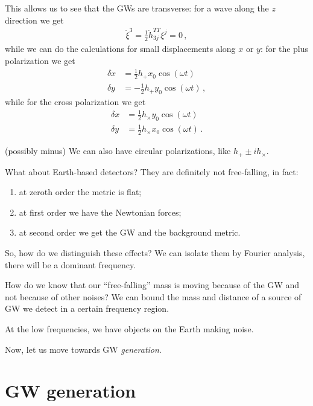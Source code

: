 \documentclass[main.tex]{subfiles}
\begin{document}
This allows us to see that the GWs are transverse: for a wave along the \(z\) direction we get 
%
\begin{align}
\ddot{\xi}^{3} = \frac{1}{2} \ddot{h}_{3j}^{TT} \xi^{j} = 0
\,,
\end{align}
%
while we can do the calculations for small displacements along \(x\) or \(y\): for the plus polarization we get 
%
\begin{subequations}
\begin{align}
  \delta x &= \frac{1}{2} h_{+} x_0 \cos(\omega t)  \\
  \delta y &= - \frac{1}{2} h_{+} y_0 \cos(\omega t)  
\,,
\end{align}
\end{subequations}
%
while for the cross polarization we get 
%
\begin{subequations}
\begin{align}
\delta x &= \frac{1}{2} h_{ \times } y_0 \cos(\omega t)  \\
\delta y &= \frac{1}{2} h_{ \times } x_0 \cos(\omega t)  
\,.
\end{align}
\end{subequations}

(possibly minus)
We can also have circular polarizations, like \(h_+ \pm i h_{  \times }\). 

What about Earth-based detectors? 
They are definitely not free-falling, in fact: 
\begin{enumerate}
  \item at zeroth order the metric is flat;
  \item at first order we have the Newtonian forces;
  \item at second order we get the GW and the background metric.
\end{enumerate}

So, how do we distinguish these effects? We can isolate them by Fourier analysis, there will be a dominant frequency. 

How do we know that our ``free-falling'' mass is moving because of the GW and not because of other noises?
We can bound the mass and distance of a source of GW we detect in a certain frequency region. 

At the low frequencies, we have objects on the Earth making noise. 

Now, let us move towards GW \emph{generation}.

\section{GW generation}
\end{document}
